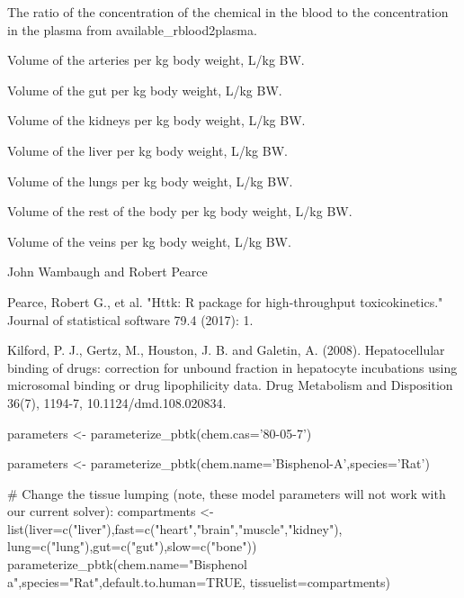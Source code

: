 \documentclass[a4paper]{book}
\begin{document}
\begin{Value}
\begin{ldescription}
\item[\code{Rblood2plasma}] The ratio of the concentration of the chemical in the
blood to the concentration in the plasma from available\_rblood2plasma.
\item[\code{Vartc}] Volume of the arteries per kg body weight, L/kg BW.
\item[\code{Vgutc}] Volume of the gut per kg body weight, L/kg BW.
\item[\code{Vkidneyc}] Volume of the kidneys per kg body weight, L/kg BW.
\item[\code{Vliverc}] Volume of the liver per kg body weight, L/kg BW.
\item[\code{Vlungc}] Volume of the lungs per kg body weight, L/kg BW.
\item[\code{Vrestc}]  Volume of the rest of the body per kg body weight, L/kg BW.
\item[\code{Vvenc}] Volume of the veins per kg body weight, L/kg BW.
\end{ldescription}
\end{Value}
%
\begin{Author}\relax
John Wambaugh and Robert Pearce
\end{Author}
%
\begin{References}\relax
Pearce, Robert G., et al. "Httk: R package for high-throughput 
toxicokinetics." Journal of statistical software 79.4 (2017): 1.

Kilford, P. J., Gertz, M., Houston, J. B. and Galetin, A.
(2008). Hepatocellular binding of drugs: correction for unbound fraction in
hepatocyte incubations using microsomal binding or drug lipophilicity data.
Drug Metabolism and Disposition 36(7), 1194-7, 10.1124/dmd.108.020834.
\end{References}
%
\begin{Examples}
\begin{ExampleCode}

 parameters <- parameterize_pbtk(chem.cas='80-05-7')

 parameters <- parameterize_pbtk(chem.name='Bisphenol-A',species='Rat')

 # Change the tissue lumping (note, these model parameters will not work with our current solver):
 compartments <- list(liver=c("liver"),fast=c("heart","brain","muscle","kidney"),
                      lung=c("lung"),gut=c("gut"),slow=c("bone"))
 parameterize_pbtk(chem.name="Bisphenol a",species="Rat",default.to.human=TRUE,
                   tissuelist=compartments) 

\end{ExampleCode}
\end{Examples}
\end{document}
